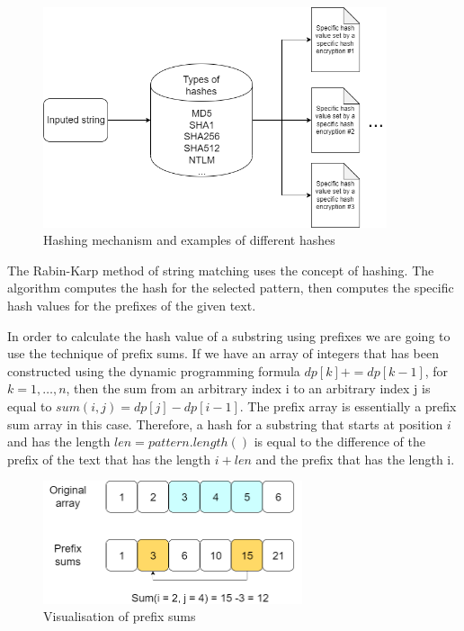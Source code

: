 \documentclass[letterpaper]{article}
\begin{document}
\begin{figure} [h!]
\centering
\includegraphics[width=0.9\textwidth]{pngOfDiagrams/hashingExplained.png}
\caption{Hashing mechanism and examples of different hashes}
\end{figure}

The Rabin-Karp method of string matching uses the concept of hashing. The algorithm computes the hash for the selected pattern, then computes the specific hash values for the prefixes of the given text.

In order to calculate the hash value of a substring using prefixes we are going to use the technique of prefix sums. If we have an array of integers that has been constructed using the dynamic programming formula $dp[k] += dp[k - 1]$, for $k=1,\dots,n$, then the sum from an arbitrary index i to an arbitrary index j is equal to $sum(i, j) = dp[j] - dp[i - 1]$. The prefix array is essentially a prefix sum array in this case. Therefore, a hash for a substring that starts at position $i$ and has the length $len = pattern.length()$ is equal to the difference of the prefix of the text that has the length $i + len$ and the prefix that has the length i.   

\begin{figure} [h!]
\centering
\includegraphics[width=0.68\textwidth]{pngOfDiagrams/prefixSums.png}
\caption{Visualisation of prefix sums}
\end{figure}
\end{document}
